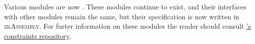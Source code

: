 Various modules are now \specDeprecated{}.
These modules continue to exist,
and their interfaces with other modules remain the same,
but their specification is now written in \textsc{zkAssembly}.
For furter information on these modules the reader should consult
\href{https://github.com/Consensys/linea-constraints}{\linea{}'s constraints repository}.

